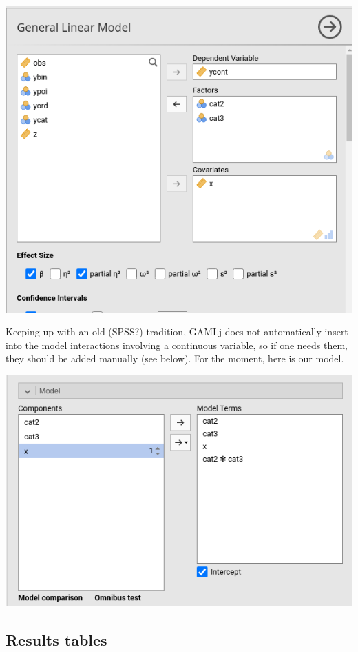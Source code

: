 \documentclass[
]{book}
\begin{document}
\includegraphics[width=8.14in]{bookletpics/2_ancova_input1}

Keeping up with an old (SPSS?) tradition, {GAMLj} does not automatically insert into the model interactions involving a continuous variable, so if one needs them, they should be added manually (see below). For the moment, here is our model.

\includegraphics[width=8.01in]{bookletpics/2_ancova_input2}

\hypertarget{results-tables}{%
\subsection{Results tables}\label{results-tables}}
\end{document}
